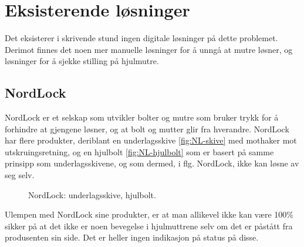 \section{Eksisterende løsninger}
Det eksisterer i skrivende stund ingen digitale løsninger på dette problemet. 
Derimot finnes det noen mer manuelle løsninger for å unngå at mutre løsner, 
og løsninger for å sjekke stilling på hjulmutre.
\subsection{NordLock}
NordLock er et selskap som utvikler bolter og mutre som bruker trykk for å forhindre 
at gjengene løsner, og at bolt og mutter glir fra hverandre. NordLock har flere 
produkter, deriblant en underlagsskive \ref{fig:NL-skive}\cite{NL-skive} med mothaker mot 
utskruingsretning, og en hjulbolt 
\ref{fig:NL-hjulbolt}\cite{NL-hjulbolt} som er basert på samme prinsipp som 
underlagsskivene, og som dermed, i flg. NordLock, ikke kan løsne av seg selv.
\newline
\begin{figure}[H]
%
\hfill
{}%
\caption{NordLock: \protect{\ref{fig:NL-skive}} underlagsskive, \protect{\ref{fig:NL-hjulbolt}} hjulbolt.}
\end{figure}
Ulempen med NordLock sine produkter, er at man allikevel ikke kan være 100\% sikker
på at det ikke er noen bevegelse i hjulmuttrene selv om det er påstått fra 
produsenten sin side. Det er heller ingen indikasjon på status på disse.

